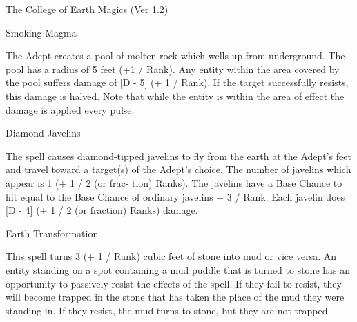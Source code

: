 \begin{Chapter}{The College of Earth Magics (Ver 1.2)}
\begin{spell}[S-17]{Smoking Magma}

\begin{effects}
The Adept creates a pool of molten rock which wells up from
underground.  The pool has a radius of 5 feet (+1 / Rank).  Any entity
within the area covered by the pool suffers damage of [D - 5] (+ 1 /
Rank).  If the target successfully resists, this damage is halved.
Note that while the entity is within the area of effect the damage is
applied every pulse.

\end{effects}
\end{spell}

\begin{spell}[S-18]{Diamond Javelins}

\begin{effects}
The spell causes diamond-tipped javelins to fly from the earth at the
Adept’s feet and travel toward a target(s) of the Adept’s choice. The
number of javelins which appear is 1 (+ 1 / 2 (or frac- tion) Ranks).
The javelins have a Base Chance to hit equal to the Base Chance of
ordinary javelins + 3 / Rank.  Each javelin does [D - 4] (+ 1 / 2 (or
fraction) Ranks) damage.

\end{effects}
\end{spell}

\begin{spell}[S-19]{Earth Transformation}

\begin{effects}
This spell turns 3 (+ 1 / Rank) cubic feet of stone into mud or vice
versa. An entity standing on a spot containing a mud puddle that is
turned to stone has an opportunity to passively resist the effects of
the spell.  If they fail to resist, they will become trapped in the
stone that has taken the place of the mud they were standing in.  If
they resist, the mud turns to stone, but they are not trapped.
\end{effects}
\end{spell}


\end{Chapter}
